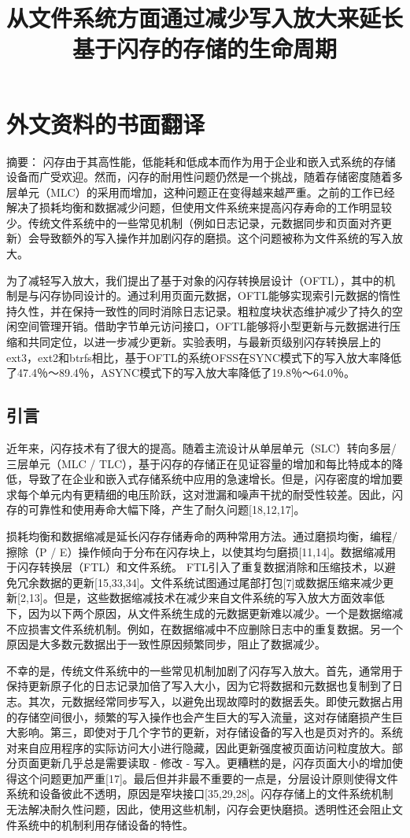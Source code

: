 \chapter{外文资料的书面翻译}

\title{从文件系统方面通过减少写入放大来延长基于闪存的存储的生命周期}

{\heiti 摘要：} 闪存由于其高性能，低能耗和低成本而作为用于企业和嵌入式系统的存储设备而广受欢迎。然而，闪存的耐用性问题仍然是一个挑战，随着存储密度随着多层单元（MLC）的采用而增加，这种问题正在变得越来越严重。之前的工作已经解决了损耗均衡和数据减少问题，但使用文件系统来提高闪存寿命的工作明显较少。传统文件系统中的一些常见机制（例如日志记录，元数据同步和页面对齐更新）会导致额外的写入操作并加剧闪存的磨损。这个问题被称为文件系统的写入放大。

为了减轻写入放大，我们提出了基于对象的闪存转换层设计（OFTL），其中的机制是与闪存协同设计的。通过利用页面元数据，OFTL能够实现索引元数据的惰性持久性，并在保持一致性的同时消除日志记录。粗粒度块状态维护减少了持久的空闲空间管理开销。借助字节单元访问接口，OFTL能够将小型更新与元数据进行压缩和共同定位，以进一步减少更新。实验表明，与最新页级别闪存转换层上的ext3，ext2和btrfs相比，基于OFTL的系统OFSS在SYNC模式下的写入放大率降低了47.4％〜89.4％，ASYNC模式下的写入放大率降低了19.8％〜64.0％。

\section{引言}
近年来，闪存技术有了很大的提高。随着主流设计从单层单元（SLC）转向多层/三层单元（MLC / TLC），基于闪存的存储正在见证容量的增加和每比特成本的降低，导致了在企业和嵌入式存储系统中应用的急速增长。但是，闪存密度的增加要求每个单元内有更精细的电压阶跃，这对泄漏和噪声干扰的耐受性较差。因此，闪存的可靠性和使用寿命大幅下降，产生了耐久问题[18,12,17]。

损耗均衡和数据缩减是延长闪存存储寿命的两种常用方法。通过磨损均衡，编程/擦除（P / E）操作倾向于分布在闪存块上，以使其均匀磨损[11,14]。数据缩减用于闪存转换层（FTL）和文件系统。 FTL引入了重复数据消除和压缩技术，以避免冗余数据的更新[15,33,34]。文件系统试图通过尾部打包[7]或数据压缩来减少更新[2,13]。但是，这些数据缩减技术在减少来自文件系统的写入放大方面效率低下，因为以下两个原因，从文件系统生成的元数据更新难以减少。一个是数据缩减不应损害文件系统机制。例如，在数据缩减中不应删除日志中的重复数据。另一个原因是大多数元数据出于一致性原因频繁同步，阻止了数据减少。

不幸的是，传统文件系统中的一些常见机制加剧了闪存写入放大。首先，通常用于保持更新原子化的日志记录加倍了写入大小，因为它将数据和元数据也复制到了日志。其次，元数据经常同步写入，以避免出现故障时的数据丢失。即使元数据占用的存储空间很小，频繁的写入操作也会产生巨大的写入流量，这对存储磨损产生巨大影响。第三，即使对于几个字节的更新，对存储设备的写入也是页对齐的。系统对来自应用程序的实际访问大小进行隐藏，因此更新强度被页面访问粒度放大。部分页面更新几乎总是需要读取 - 修改 - 写入。更糟糕的是，闪存页面大小的增加使得这个问题更加严重[17]。最后但并非最不重要的一点是，分层设计原则使得文件系统和设备彼此不透明，原因是窄块接口[35,29,28]。闪存存储上的文件系统机制无法解决耐久性问题，因此，使用这些机制，闪存会更快磨损。透明性还会阻止文件系统中的机制利用存储设备的特性。

